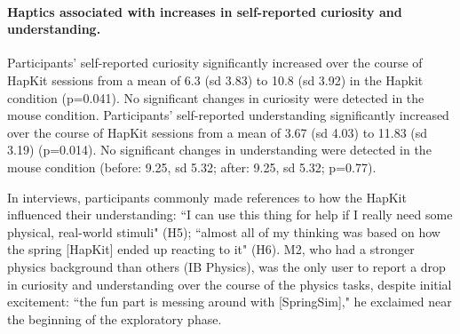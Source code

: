 \paragraph{Haptics associated with increases in self-reported curiosity and understanding.}
Participants' self-reported curiosity significantly increased over the course of HapKit sessions 
from a mean of 6.3 (sd 3.83) %
to 10.8 (sd 3.92) in the Hapkit condition %
(p=0.041). %
No significant changes in curiosity were detected in the mouse condition.
Participants' self-reported understanding significantly increased over the course of HapKit sessions from a mean of 3.67 (sd 4.03) to 11.83 (sd 3.19) (p=0.014). %
No significant changes in understanding were detected in the mouse condition (before: 9.25, sd 5.32; after: 9.25, sd 5.32; p=0.77). %

In interviews, participants commonly made references to how the HapKit influenced their understanding: ``I can use this thing for help if I really need some physical, real-world stimuli" (H5); %
``almost all of my thinking was based on how the spring [HapKit] ended up reacting to it" (H6).
M2, who had a stronger physics background than others (IB Physics),  was the only user to report a drop in curiosity and understanding over the course of the physics tasks, despite initial excitement:
``the fun part is messing around with  [SpringSim]," he exclaimed near the beginning of the exploratory phase. 

